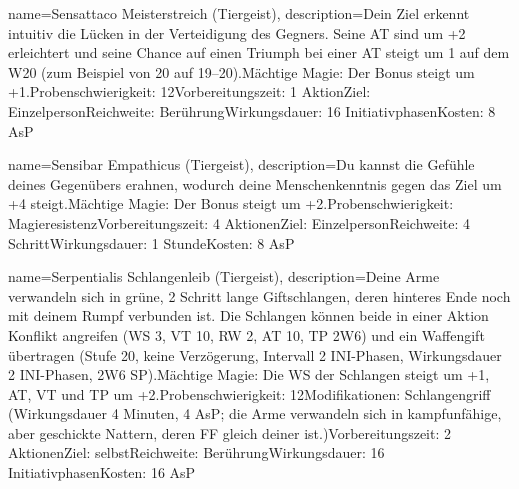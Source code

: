 {
    name={Sensattaco Meisterstreich (Tiergeist)},
    description={Dein Ziel erkennt intuitiv die Lücken in der Verteidigung des Gegners. Seine AT sind um +2 erleichtert und seine Chance auf einen Triumph bei einer AT steigt um 1 auf dem W20 (zum Beispiel von 20 auf 19–20).\newline Mächtige Magie: Der Bonus steigt um +1.\newline Probenschwierigkeit: 12\newline Vorbereitungszeit: 1 Aktion\newline Ziel: Einzelperson\newline Reichweite: Berührung\newline Wirkungsdauer: 16 Initiativphasen\newline Kosten: 8 AsP}
}


{
    name={Sensibar Empathicus (Tiergeist)},
    description={Du kannst die Gefühle deines Gegenübers erahnen, wodurch deine Menschenkenntnis gegen das Ziel um +4 steigt.\newline Mächtige Magie: Der Bonus steigt um +2.\newline Probenschwierigkeit: Magieresistenz\newline Vorbereitungszeit: 4 Aktionen\newline Ziel: Einzelperson\newline Reichweite: 4 Schritt\newline Wirkungsdauer: 1 Stunde\newline Kosten: 8 AsP}
}


{
    name={Serpentialis Schlangenleib (Tiergeist)},
    description={Deine Arme verwandeln sich in grüne, 2 Schritt lange Giftschlangen, deren hinteres Ende noch mit deinem Rumpf verbunden ist. Die Schlangen können beide in einer Aktion Konflikt angreifen (WS 3, VT 10, RW 2, AT 10, TP 2W6) und ein Waffengift übertragen (Stufe 20, keine Verzögerung, Intervall 2 INI-Phasen, Wirkungsdauer 2 INI-Phasen, 2W6 SP).\newline Mächtige Magie: Die WS der Schlangen steigt um +1, AT, VT und TP um +2.\newline Probenschwierigkeit: 12\newline Modifikationen: Schlangengriff (Wirkungsdauer 4 Minuten, 4 AsP; die Arme verwandeln sich in kampfunfähige, aber geschickte Nattern, deren FF gleich deiner ist.)\newline Vorbereitungszeit: 2 Aktionen\newline Ziel: selbst\newline Reichweite: Berührung\newline Wirkungsdauer: 16 Initiativphasen\newline Kosten: 16 AsP}
}


